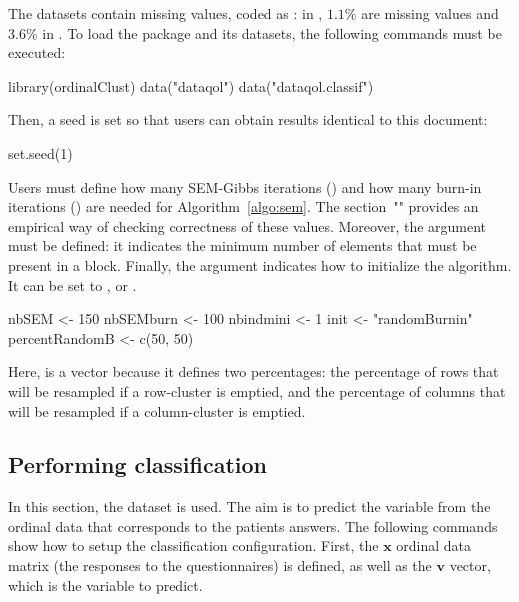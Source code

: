 \noindent The datasets contain missing values, coded as : in , $1.1\%$ are missing values and $3.6\%$ in . To load the package and its datasets, the following commands must be executed:


\begin{example}
library(ordinalClust)
data("dataqol")
data("dataqol.classif")
\end{example}


\noindent Then, a seed is set so that users can obtain results identical to this document:
\begin{example}
set.seed(1)
\end{example}


\noindent Users must define how many SEM-Gibbs iterations () and how many burn-in iterations () are needed for Algorithm~\ref{algo:sem}. The section~"" provides an empirical way of checking correctness of these values. Moreover, the  argument must be defined: it indicates the minimum number of elements that must be present in a block. Finally, the  argument indicates how to initialize the algorithm. It can be set to ,  or .


\begin{example}
nbSEM <- 150
nbSEMburn <- 100
nbindmini <- 1
init <- "randomBurnin"
percentRandomB <- c(50, 50)
\end{example}

Here,  is a vector because it defines two percentages: the percentage of rows that will be resampled if a row-cluster is emptied, and the percentage of columns that will be resampled if a column-cluster is emptied.

\subsection{Performing classification}

\label{sec:classif}
In this section, the  dataset is used. The aim is to predict the  variable from the ordinal data that corresponds to the patients answers. The following commands show how to setup the classification configuration. First, the $\boldsymbol{x}$ ordinal data matrix (the responses to the questionnaires) is defined, as well as the $\boldsymbol{v}$ vector, which is the variable  to predict.

